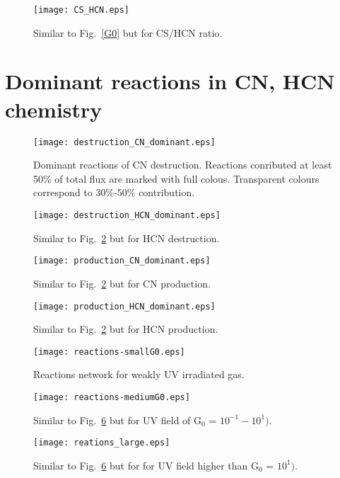 \documentclass{aa}
\begin{document}
\begin{appendix}
\begin{figure}
   \centering
   \texttt{[image: CS\_HCN.eps]}
      \caption{Similar to Fig.~\ref{G0} but for CS/HCN ratio.}
         \label{CS/HCN}
   \end{figure}

\section{Dominant reactions in CN, HCN chemistry}

\begin{figure}
\texttt{[image: destruction\_CN\_dominant.eps]}
\caption{Dominant reactions of CN destruction. Reactions conributed at least 50$\%$ of total flux are marked with full colous. Transparent colours correspond to 30$\%$-50$\%$ contribution.}
\label{CN_dest}
\end{figure}

\begin{figure}
\texttt{[image: destruction\_HCN\_dominant.eps]}
\caption{Similar to Fig.~\ref{CN_dest} but for HCN destruction.}
\label{HCN_dest}
\end{figure}

\begin{figure}
\texttt{[image: production\_CN\_dominant.eps]}
\caption{Similar to Fig.~\ref{CN_dest} but for CN production.}
\label{CN_prod}
\end{figure}

\begin{figure}
\texttt{[image: production\_HCN\_dominant.eps]}
\caption{Similar to Fig.~\ref{CN_dest} but for HCN production.}
\label{HCN_prod}
\end{figure}

\begin{figure}
\texttt{[image: reactions-smallG0.eps]}
\caption{Reactions network for weakly UV irradiated gas.}
\label{reactions_smallG0}
\end{figure}

\begin{figure}
\texttt{[image: reactions-mediumG0.eps]}
\caption{Similar to Fig.~\ref{reactions_smallG0} but for UV field of G$_0$ = $10^{-1} - 10^{1})$.}
\label{reactions_mediumG0}
\end{figure}

\begin{figure}
\texttt{[image: reations\_large.eps]}
\caption{Similar to Fig.~\ref{reactions_smallG0} but for for UV field higher than G$_0$ = $10^{1})$.}
\label{reactions_largeG0}
\end{figure}

\end{appendix}
\end{document}
